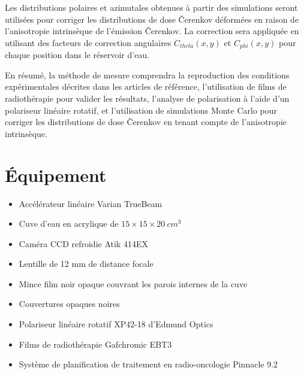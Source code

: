 \documentclass{Thesis}
\begin{document}
Les distributions polaires et azimutales obtenues à partir des simulations seront utilisées pour corriger les distributions de dose Čerenkov déformées en raison de l'anisotropie intrinsèque de l'émission Čerenkov.
La correction sera appliquée en utilisant des facteurs de correction angulaires $C_{theta}(x, y)$ et $C_{phi}(x, y)$ pour chaque position dans le réservoir d'eau.

En résumé, la méthode de mesure comprendra la reproduction des conditions expérimentales décrites dans les articles de référence, l'utilisation de films de radiothérapie pour valider les résultats, l'analyse de polarisation à l'aide d'un polariseur linéaire rotatif, et l'utilisation de simulations Monte Carlo pour corriger les distributions de dose Čerenkov en tenant compte de l'anisotropie intrinsèque.

\section*{Équipement}
\begin{multicols}{2}
\begin{itemize}
    \setlength\itemsep{1mm}
    \item Accélérateur linéaire Varian TrueBeam
    \item Cuve d'eau en acrylique de $15 \times 15 \times \SI{20}{cm^3}$
    \item Caméra CCD refroidie Atik 414EX
    \item Lentille de 12 mm de distance focale
    \item Mince film noir opaque couvrant les parois internes de la cuve
    \item Couvertures opaques noires
    \item Polariseur linéaire rotatif XP42-18 d'Edmund Optics
    \item Films de radiothérapie Gafchromic EBT3
    \item Système de planification de traitement en radio-oncologie Pinnacle 9.2
\end{itemize}
\end{multicols}

\newpage
\printbibliography
\end{document}
